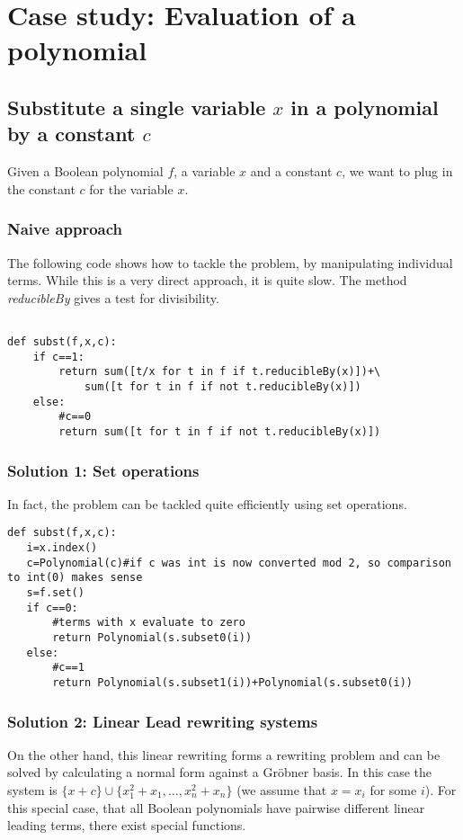 \documentclass[]{article}
\newcommand{\functionname}[1]{\textit{#1}\xspace}
\newcommand{\explfieldequations}{{x_1^2+x_1,\ldots,x_n^2+x_n}}
\begin{document}
\section{Case study: Evaluation of a polynomial}

\subsection{Substitute a single variable $x$ in a polynomial by a constant $c$}

Given a Boolean polynomial $f$, a variable $x$ and a constant $c$, we want to plug in the constant $c$ for the variable $x$.
\subsubsection{Naive approach}
The following code shows how to tackle the problem, by manipulating individual terms.
While this is a very direct approach, it is quite slow.
The method \functionname{reducibleBy} gives a test for divisibility.
\begin{verbatim}

def subst(f,x,c):
    if c==1:
        return sum([t/x for t in f if t.reducibleBy(x)])+\
            sum([t for t in f if not t.reducibleBy(x)])
    else:
        #c==0
        return sum([t for t in f if not t.reducibleBy(x)])

\end{verbatim}
\subsubsection{Solution 1: Set operations}
In fact, the problem can be tackled quite efficiently using set operations.
\begin{verbatim}
def subst(f,x,c):
   i=x.index()
   c=Polynomial(c)#if c was int is now converted mod 2, so comparison to int(0) makes sense
   s=f.set()
   if c==0:
       #terms with x evaluate to zero
       return Polynomial(s.subset0(i))
   else:
       #c==1
       return Polynomial(s.subset1(i))+Polynomial(s.subset0(i))    
\end{verbatim}
\subsubsection{Solution 2: Linear Lead rewriting systems}
On the other hand, this linear rewriting forms a rewriting problem and can be solved by calculating a normal form against a Gröbner basis.
In this case the system is $\{x+c\} \cup \{\explfieldequations\}$ (we assume that $x=x_i$ for some $i$).
For this special case, that all Boolean polynomials have pairwise different linear leading terms,
there exist special functions.
\end{document}
